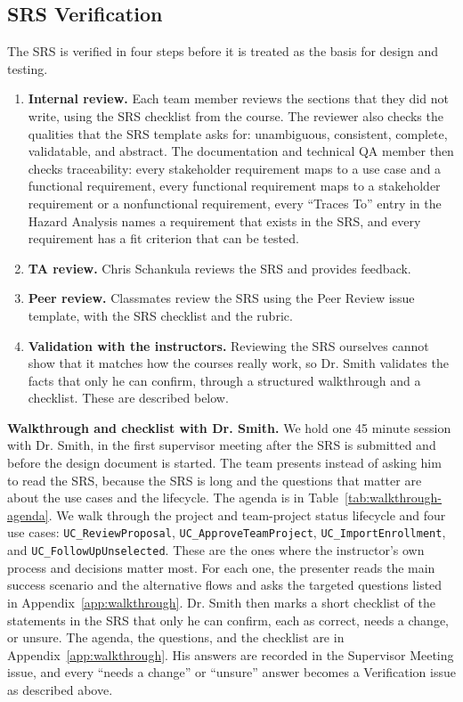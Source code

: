 \documentclass[12pt, titlepage]{article}
\begin{document}
  \subsection{SRS Verification}
  \label{sec:srs-verification}

  The SRS \citep{SRS} is verified in four steps before it is treated as the basis for design and testing.

  \begin{enumerate}
    \item \textbf{Internal review.} Each team member reviews the sections that they did not write,
    using the SRS checklist from the course. The reviewer also checks the qualities that the SRS
    template asks for: unambiguous, consistent, complete, validatable, and abstract.
    The documentation and technical QA member then checks traceability:
    every stakeholder requirement maps to a use case and a functional requirement,
    every functional requirement maps to a stakeholder requirement or a nonfunctional requirement,
    every ``Traces To'' entry in the Hazard Analysis \citep{HazardAnalysis} names a requirement that exists in the SRS,
    and every requirement has a fit criterion that can be tested.
    \item \textbf{TA review.} Chris Schankula reviews the SRS and provides feedback.
    \item \textbf{Peer review.} Classmates review the SRS using the Peer Review issue template, with the SRS checklist and the rubric.
    \item \textbf{Validation with the instructors.} Reviewing the SRS ourselves cannot show that it matches how the courses really work,
    so Dr. Smith validates the facts that only he can confirm, through a structured walkthrough and a checklist. These are described below.
  \end{enumerate}

  \textbf{Walkthrough and checklist with Dr. Smith.} We hold one 45 minute session with Dr. Smith,
  in the first supervisor meeting after the SRS is submitted and before the design document is started.
  The team presents instead of asking him to read the SRS, because the SRS is long and the questions
  that matter are about the use cases and the lifecycle. The agenda is in Table~\ref{tab:walkthrough-agenda}.
  We walk through the project and team-project status
  lifecycle and four use cases: \texttt{UC\_ReviewProposal}, \texttt{UC\_ApproveTeamProject},
  \texttt{UC\_ImportEnrollment}, and \texttt{UC\_FollowUpUnselected}.
  These are the ones where the instructor's own process and decisions matter most.
  For each one, the presenter reads the main success scenario and the alternative flows and asks the
  targeted questions listed in Appendix~\ref{app:walkthrough}.
  Dr. Smith then marks a short checklist of the statements in the SRS that only he can confirm, each as correct,
  needs a change, or unsure. The agenda, the questions, and the checklist are in Appendix~\ref{app:walkthrough}.
  His answers are recorded in the Supervisor Meeting issue, and every ``needs a change'' or ``unsure'' answer
  becomes a Verification issue as described above.
\end{document}
